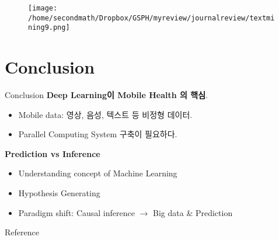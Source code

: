 \documentclass{beamer}
\begin{document}
\begin{frame}
\begin{figure}
\texttt{[image: /home/secondmath/Dropbox/GSPH/myreview/journalreview/textmining9.png]}
\end{figure}
\end{frame}

\section{\protect\textbf{Conclusion}}
\begin{frame}{Conclusion}
\textbf{Deep Learning이 Mobile Health 의 핵심}.
\begin{itemize}
  \item Mobile data: 영상, 음성, 텍스트 등 비정형 데이터. 
  \item Parallel Computing System 구축이 필요하다. 
\end{itemize}
\textbf{Prediction vs Inference}
\begin{itemize}
  \item Understanding concept of Machine Learning
  \item Hypothesis Generating
  \item Paradigm shift: Causal inference $\rightarrow$ Big data \& Prediction
\end{itemize}
\end{frame}





\begin{frame}[allowframebreaks]{Reference}\tiny


\end{frame}
\end{document}
